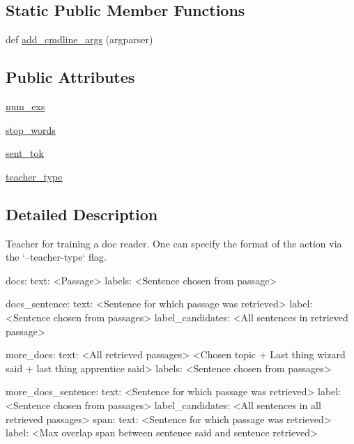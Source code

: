 \subsection*{Static Public Member Functions}
\begin{DoxyCompactItemize}
\item 
def \hyperlink{classparlai_1_1tasks_1_1wizard__of__wikipedia_1_1agents_1_1DocreaderTeacher_a4c307fc0411f560ff9ccf0bdd8a794ef}{add\+\_\+cmdline\+\_\+args} (argparser)
\end{DoxyCompactItemize}
\subsection*{Public Attributes}
\begin{DoxyCompactItemize}
\item 
\hyperlink{classparlai_1_1tasks_1_1wizard__of__wikipedia_1_1agents_1_1DocreaderTeacher_a5c7fd889baaca59e8d1bcb105084cc4a}{num\+\_\+exs}
\item 
\hyperlink{classparlai_1_1tasks_1_1wizard__of__wikipedia_1_1agents_1_1DocreaderTeacher_a3f6ba852ce8621883a21c1f4fadb9814}{stop\+\_\+words}
\item 
\hyperlink{classparlai_1_1tasks_1_1wizard__of__wikipedia_1_1agents_1_1DocreaderTeacher_adfa0a51acde58e5cbfa9553b06594852}{sent\+\_\+tok}
\item 
\hyperlink{classparlai_1_1tasks_1_1wizard__of__wikipedia_1_1agents_1_1DocreaderTeacher_a4582a196ca5c413be227f84c48afb4b5}{teacher\+\_\+type}
\end{DoxyCompactItemize}


\subsection{Detailed Description}
\begin{DoxyVerb}Teacher for training a doc reader. One can specify the format of the action via the
`--teacher-type` flag.

docs:
    {
        text: <Passage> 
        labels: <Sentence chosen from passage>
    }

docs_sentence:
    {
        text: <Sentence for which passage was retrieved>
        label: <Sentence chosen from passages>
        label_candidates: <All sentences in retrieved passage>
    }

more_docs:
    {
        text: <All retrieved passages> \n
              <Chosen topic + Last thing wizard said + last thing apprentice said>
        labels: <Sentence chosen from passages>
    }

more_docs_sentence:
    {
        text: <Sentence for which passage was retrieved>
        label: <Sentence chosen from passages>
        label_candidates: <All sentences in all retrieved passages>
    }
span:
    {
        text: <Sentence for which passage was retrieved>
        label: <Max overlap span between sentence said and sentence retrieved>
    }
\end{DoxyVerb}
 

